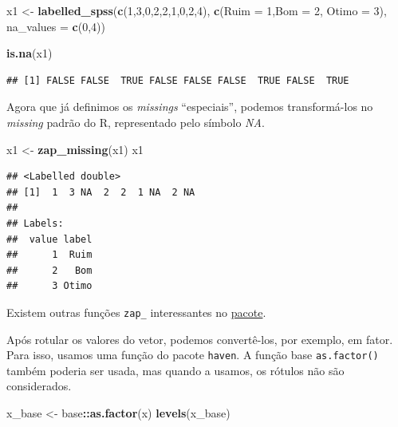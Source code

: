 \documentclass[
]{book}
\newenvironment{Shaded}{\begin{snugshade}}{\end{snugshade}}
\newcommand{\DataTypeTok}[1]{\textcolor[rgb]{0.13,0.29,0.53}{#1}}
\newcommand{\DecValTok}[1]{\textcolor[rgb]{0.00,0.00,0.81}{#1}}
\newcommand{\KeywordTok}[1]{\textcolor[rgb]{0.13,0.29,0.53}{\textbf{#1}}}
\newcommand{\NormalTok}[1]{#1}
\newcommand{\OperatorTok}[1]{\textcolor[rgb]{0.81,0.36,0.00}{\textbf{#1}}}
\newcommand{\StringTok}[1]{\textcolor[rgb]{0.31,0.60,0.02}{#1}}
\begin{document}
\begin{Shaded}
\begin{Highlighting}[]
\NormalTok{x1 <{-}}\StringTok{ }\KeywordTok{labelled\_spss}\NormalTok{(}\KeywordTok{c}\NormalTok{(}\DecValTok{1}\NormalTok{,}\DecValTok{3}\NormalTok{,}\DecValTok{0}\NormalTok{,}\DecValTok{2}\NormalTok{,}\DecValTok{2}\NormalTok{,}\DecValTok{1}\NormalTok{,}\DecValTok{0}\NormalTok{,}\DecValTok{2}\NormalTok{,}\DecValTok{4}\NormalTok{), }\KeywordTok{c}\NormalTok{(}\DataTypeTok{Ruim =} \DecValTok{1}\NormalTok{,}\DataTypeTok{Bom =} \DecValTok{2}\NormalTok{, }\DataTypeTok{Otimo =} \DecValTok{3}\NormalTok{), }\DataTypeTok{na\_values =} \KeywordTok{c}\NormalTok{(}\DecValTok{0}\NormalTok{,}\DecValTok{4}\NormalTok{))}
    
\KeywordTok{is.na}\NormalTok{(x1)}
\end{Highlighting}
\end{Shaded}

\begin{verbatim}
## [1] FALSE FALSE  TRUE FALSE FALSE FALSE  TRUE FALSE  TRUE
\end{verbatim}

Agora que já definimos os \emph{missings} ``especiais'', podemos transformá-los no \emph{missing} padrão do R, representado pelo símbolo \emph{NA}.

\begin{Shaded}
\begin{Highlighting}[]
\NormalTok{x1 <{-}}\StringTok{ }\KeywordTok{zap\_missing}\NormalTok{(x1)}
\NormalTok{x1}
\end{Highlighting}
\end{Shaded}

\begin{verbatim}
## <Labelled double>
## [1]  1  3 NA  2  2  1 NA  2 NA
## 
## Labels:
##  value label
##      1  Ruim
##      2   Bom
##      3 Otimo
\end{verbatim}

Existem outras funções \texttt{zap\_} interessantes no \href{https://cran.r-project.org/web/packages/haven/haven.pdf}{pacote}.

Após rotular os valores do vetor, podemos convertê-los, por exemplo, em fator. Para isso, usamos uma função do pacote \texttt{haven}.
A função base \texttt{as.factor()} também poderia ser usada, mas quando a usamos, os rótulos não são considerados.

\begin{Shaded}
\begin{Highlighting}[]
\NormalTok{x\_base <{-}}\StringTok{ }\NormalTok{base}\OperatorTok{::}\KeywordTok{as.factor}\NormalTok{(x)}
\KeywordTok{levels}\NormalTok{(x\_base)}
\end{Highlighting}
\end{Shaded}
\end{document}
